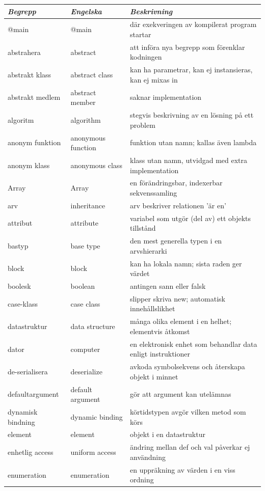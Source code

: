 \begin{tabular}{l|l|l}
\textit{Begrepp} & \textit{Engelska} & \textit{Beskrivning} \\ \hline \hline
@main & @main & där exekveringen av kompilerat program startar \\
abstrahera & abstract & att införa nya begrepp som förenklar kodningen \\
abstrakt klass & abstract class & kan ha parametrar, kan ej instansieras, kan ej mixas in \\
abstrakt medlem & abstract member & saknar implementation \\
algoritm & algorithm & stegvis beskrivning av en lösning på ett problem \\
anonym funktion & anonymous function & funktion utan namn; kallas även lambda \\
anonym klass & anonymous class & klass utan namn, utvidgad med extra implementation \\
Array & Array & en förändringsbar, indexerbar sekvenssamling \\
arv & inheritance & arv beskriver relationen 'är en' \\
attribut & attribute & variabel som utgör (del av) ett objekts tillstånd \\
bastyp & base type & den mest generella typen i en arvshierarki \\
block & block & kan ha lokala namn; sista raden ger värdet \\
boolesk & boolean & antingen sann eller falsk \\
case-klass & case class & slipper skriva new; automatisk innehållslikhet \\
datastruktur & data structure & många olika element i en helhet; elementvis åtkomst \\
dator & computer & en elektronisk enhet som behandlar data enligt instruktioner \\
de-serialisera & deserialize & avkoda symbolsekvens och återskapa objekt i minnet \\
defaultargument & default argument & gör att argument kan utelämnas \\
dynamisk bindning & dynamic binding & körtidstypen avgör vilken metod som körs \\
element & element & objekt i en datastruktur \\
enhetlig access & uniform access & ändring mellan def och val påverkar ej användning \\
enumeration & enumeration & en uppräkning av värden i en viss ordning \\

\end{tabular}
